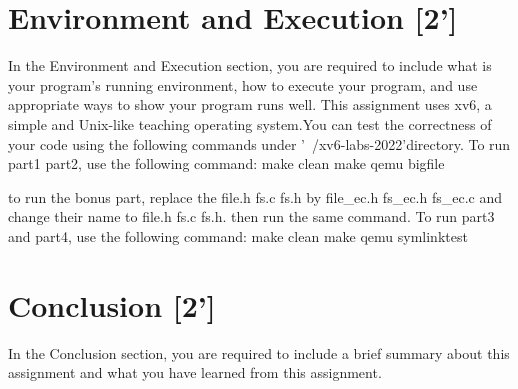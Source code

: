 \documentclass{article}
\begin{document}
\section{Environment and Execution [2']}

In the Environment and Execution section, you are required to include what is your program's running environment, how to execute your program, and use appropriate ways to show your program runs well.
This assignment uses xv6, a simple and Unix-like teaching operating system.You can test the correctness of your code using the following commands under '~/xv6-labs-2022'directory.
To run part1 part2, use the following command:
make clean
make qemu
bigfile


to run the bonus part, replace the file.h fs.c fs.h by file_ec.h  fs_ec.h  fs_ec.c and change their name to file.h fs.c fs.h. then run the same command.
To run part3 and part4, use the following command:
make clean
make qemu
symlinktest





\section{Conclusion [2']}

In the Conclusion section, you are required to include a brief summary about this assignment and what you have learned from this assignment.
\end{document}

